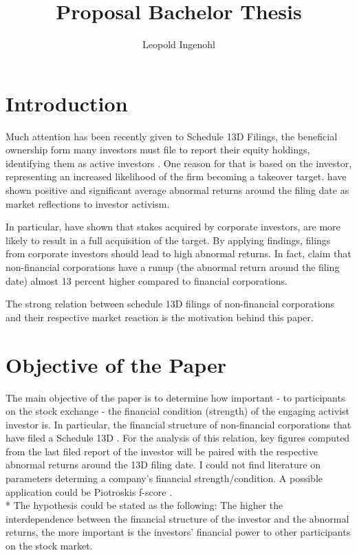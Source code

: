 \documentclass[12pt]{article}
\title{Proposal Bachelor Thesis}
\author{Leopold Ingenohl}
\begin{document}
\maketitle

\section{Introduction}
Much attention has been recently given to Schedule 13D Filings, the beneficial ownership form many investors must file to report their equity holdings, identifying them as active investors \citet{Giglia2018}. One reason for that is based on the investor, representing an increased likelihood of the firm becoming a takeover target\citep{Brigida2012}. \citet{Brav2008} have shown positive and significant average abnormal returns around the filing date as market reflections to investor activism.

In particular, \citet{Akhigbe2007} have shown that stakes acquired by corporate investors, are more likely to result in a full acquisition of the target. By applying \citep{Brav2008} findings, filings from corporate investors should lead to high abnormal returns. In fact, \citet{Brigida2012}claim that non-financial corporations have a runup (the abnormal return around the filing date) almost 13 percent higher compared to financial corporations.

The strong relation between schedule 13D filings of non-financial corporations and their respective market reaction is the motivation behind this paper.


\section{Objective of the Paper}
The main objective of the paper is to determine how important - to participants on the stock exchange - the financial condition (strength) of the engaging activist investor is. In particular, the financial structure of non-financial corporations that have filed a Schedule 13D \citep{Bell2017}. 
For the analysis of this relation, key figures computed from the last filed report of the investor will be paired with the respective abnormal returns around the 13D filing date. I could not find literature on parameters determing a company's financial strength/condition. A possible application could be Piotroskis f-score \citep{Piotroski2000}.\\*
The hypothesis could be stated as the following: The higher the interdependence between the financial structure of the investor and the abnormal returns, the more important is the investors' financial power to other participants on the stock market.
\pagebreak
\end{document}

